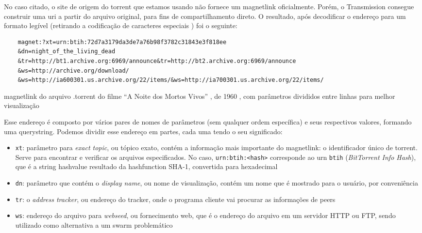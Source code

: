 No caso citado, o site de origem do \gls*{torrent} que estamos usando não fornece um
\gls*{magnetlink} oficialmente. Porém, o Transmission consegue construir uma \gls*{uri}
a partir do arquivo original, para fins de compartilhamento direto. O resultado, após
decodificar o endereço para um formato legível (retirando a codificação de caracteres
especiais \cite{wiki:urlencode}) foi o seguinte:

\begin{listing}[ht!]
    \begin{verbatim}
    magnet:?xt=urn:btih:72d7a3179da3de7a76b98f3782c31843e3f818ee
    &dn=night_of_the_living_dead
    &tr=http://bt1.archive.org:6969/announce&tr=http://bt2.archive.org:6969/announce
    &ws=http://archive.org/download/
    &ws=http://ia600301.us.archive.org/22/items/&ws=http://ia700301.us.archive.org/22/items/
    \end{verbatim}
    \caption{\gls*{magnetlink} do arquivo .torrent do filme ``A Noite dos Mortos Vivos''
    , de 1960 \cite{torrent-file}, com parâmetros divididos entre linhas para melhor
    visualização}
    \label{lst:torrent-file-magnet-link}
\end{listing}

Esse endereço é composto por vários pares de nomes de parâmetros (sem qualquer ordem
específica) e seus respectivos valores, formando uma \gls{querystring}. Podemos
dividir esse endereço em partes, cada uma tendo o seu significado:

\begin{itemize}
    \item \verb|xt|: parâmetro para \emph{exact topic}, ou tópico exato, contém a
        informação mais importante do \gls*{magnetlink}: o identificador único de
        \gls*{torrent}. Serve para encontrar e verificar os arquivos especificados.
        No caso, \verb|urn:btih:<hash>| corresponde ao \gls{urn} \verb|btih|
        (\emph{BitTorrent Info Hash}), que é a \gls*{string} \gls{hashvalue} resultado
        da \gls{hashfunction} SHA-1, convertida para hexadecimal

    \item \verb|dn|: parâmetro que contém o \emph{display name}, ou nome de
        visualização, contém um nome que é mostrado para o usuário, por conveniência

    \item \verb|tr|: o \emph{address tracker}, ou endereço do \gls*{tracker}, onde o
        programa cliente vai procurar as informações de \glspl*{peer}

    \item \verb|ws|: endereço do arquivo para \emph{webseed}, ou fornecimento web,
        que é o endereço do arquivo em um servidor HTTP ou FTP, sendo utilizado como
        alternativa a um \gls*{swarm} problemático \cite{wiki:torrent}
\end{itemize}

